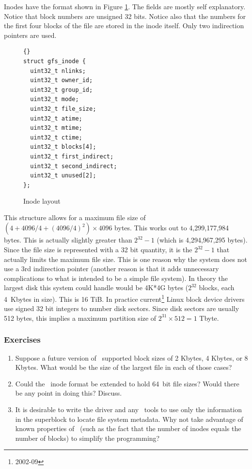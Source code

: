 Inodes have the format shown in Figure \ref{fig:inode-layout}. The fields are mostly self
explanatory. Notice that block numbers are unsigned 32 bits. Notice also that the numbers for
the first four blocks of the file are stored in the inode itself. Only two indirection pointers
are used.

\begin{figure}[htbp]
  \centering
  \begin{bigbox}
\begin{lstlisting}{}
struct gfs_inode {
  uint32_t nlinks;
  uint32_t owner_id;
  uint32_t group_id;
  uint32_t mode;
  uint32_t file_size;
  uint32_t atime;
  uint32_t mtime;
  uint32_t ctime;
  uint32_t blocks[4];
  uint32_t first_indirect;
  uint32_t second_indirect;
  uint32_t unused[2];
};
\end{lstlisting}
  \end{bigbox}
  \caption{Inode layout}
  \label{fig:inode-layout}
\end{figure}

This structure allows for a maximum file size of $(4 + 4096/4 + (4096/4)^2) \times 4096$ bytes.
This works out to 4,299,177,984 bytes. This is actually slightly greater than $2^{32} - 1$
(which is 4,294,967,295 bytes). Since the file size is represented with a 32 bit quantity, it is
the $2^{32} - 1$ that actually limits the maximum file size. This is one reason why the system
does not use a 3rd indirection pointer (another reason is that it adds unnecessary complications
to what is intended to be a simple file system). In theory the largest disk this system could
handle would be 4K*4G bytes ($2^{32}$ blocks, each 4~Kbytes in size). This is 16 TiB. In
practice current\footnote{2002-09} Linux block device drivers use signed 32 bit integers to
number disk sectors. Since disk sectors are usually 512 bytes, this implies a maximum partition
size of $2^{31} \times 512 = 1$ Tbyte.

\subsubsection*{Exercises}

\begin{enumerate}

\item Suppose a future version of \GenericFS\ supported block sizes of 2 Kbytes, 4 Kbytes, or 8
  Kbytes. What would be the size of the largest file in each of those cases?

\item Could the \GenericFS\ inode format be extended to hold 64~bit file sizes? Would there be
  any point in doing this? Discuss.

\item It is desirable to write the driver and any \GenericFS\ tools to use only the information
  in the superblock to locate file system metadata. Why not take advantage of known properties
  of \GenericFS\ (such as the fact that the number of inodes equals the number of blocks) to
  simplify the programming?

\end{enumerate}

